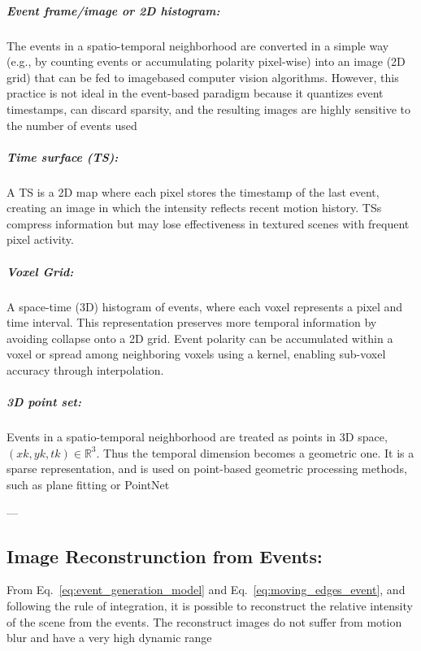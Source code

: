 \documentclass{article}
\begin{document}
\subparagraph{Event frame/image or 2D histogram:} The events in a spatio-temporal neighborhood are converted in a simple way (e.g., by counting events or accumulating polarity pixel-wise) into an image (2D grid) that can be fed to imagebased computer vision algorithms. However, this practice is not ideal in the event-based paradigm because it quantizes event timestamps, can discard sparsity, and the resulting images are highly sensitive to the number of events used

\subparagraph{Time surface (TS):} A TS is a 2D map where each pixel stores the timestamp of the last event, creating an image in which the intensity reflects recent motion history. TSs compress information but may lose effectiveness in textured scenes with frequent pixel activity.

\subparagraph{Voxel Grid:} A space-time (3D) histogram of events, where each voxel represents a pixel and time interval. This representation preserves more temporal information by avoiding collapse onto a 2D grid. Event polarity can be accumulated within a voxel or spread among neighboring voxels using a kernel, enabling sub-voxel accuracy through interpolation.

\subparagraph{3D point set:} Events in a spatio-temporal neighborhood are treated as points in 3D space, $(xk,yk,tk) \in \mathbb{R}^3$. Thus the temporal dimension becomes a geometric one. It is a sparse representation, and is used on point-based geometric processing methods, such as plane fitting or PointNet

---

\subsection{Image Reconstrunction from Events:} From Eq.~\eqref{eq:event_generation_model} and Eq.~\eqref{eq:moving_edges_event}, and following the rule of integration, it is possible to reconstruct the relative intensity of the scene from the events. The reconstruct images do not suffer from motion blur and have a very high dynamic range \cite{rebecqHighSpeedHigh2019}
\end{document}
